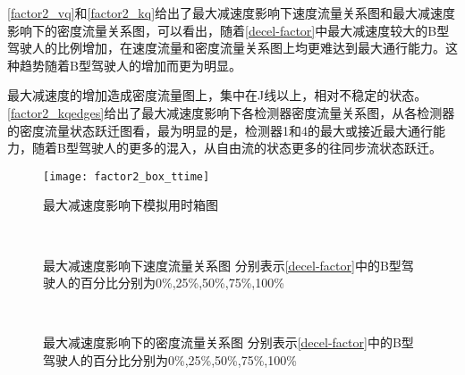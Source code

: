 \autoref{factor2_vq}和\autoref{factor2_kq}给出了最大减速度影响下速度流量关系图和最大减速度影响下的密度流量关系图，可以看出，随着\autoref{decel-factor}中最大减速度较大的B型驾驶人的比例增加，在速度流量和密度流量关系图上均更难达到最大通行能力。这种趋势随着B型驾驶人的增加而更为明显。

最大减速度的增加造成密度流量图上，集中在J线以上，相对不稳定的状态。\autoref{factor2_kqedges}给出了最大减速度影响下各检测器密度流量关系图，从各检测器的密度流量状态跃迁图看，最为明显的是，检测器1和4的最大或接近最大通行能力，随着B型驾驶人的更多的混入，从自由流的状态更多的往同步流状态跃迁。

\begin{figure}[htb]
\begin{center}
\texttt{[image: factor2\_box\_ttime]}
\caption{最大减速度影响下模拟用时箱图}
\label{factor2_box_ttime}
\end{center}
\end{figure}

\begin{figure}[htb]%
\centering
{}%
\\%
%
\caption[A set of four sub-floats.]{最大减速度影响下速度流量关系图
分别表示\autoref{decel-factor}中的B型驾驶人的百分比分别为0\%,25\%,50\%,75\%,100\%}%
\label{factor2_vq}%
\end{figure}



\begin{figure}[htb]%
\centering
{}%
\\%
%
\caption[A set of four sub-floats.]{最大减速度影响下的密度流量关系图
分别表示\autoref{decel-factor}中的B型驾驶人的百分比分别为0\%,25\%,50\%,75\%,100\%}%
\label{factor2_kq}%
\end{figure}




